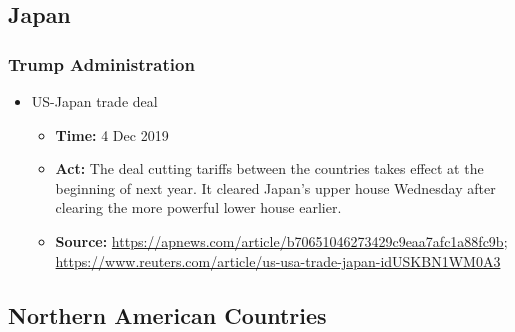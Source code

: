 	\subsection{Japan}
		\subsubsection{Trump Administration}
			\begin{itemize}
			\item	US-Japan trade deal
				\begin{itemize}
				\item \textbf{Time: }4 Dec 2019
				\item \textbf{Act: }The deal cutting tariffs between the countries takes effect at the beginning of next year. It cleared Japan’s upper house Wednesday after clearing the more powerful lower house earlier.
				\item	\textbf{Source: }\url{https://apnews.com/article/b70651046273429c9eaa7afc1a88fc9b}; \url{https://www.reuters.com/article/us-usa-trade-japan-idUSKBN1WM0A3}
				\end{itemize}
			\end{itemize}
	
		\subsection{Northern American Countries}

